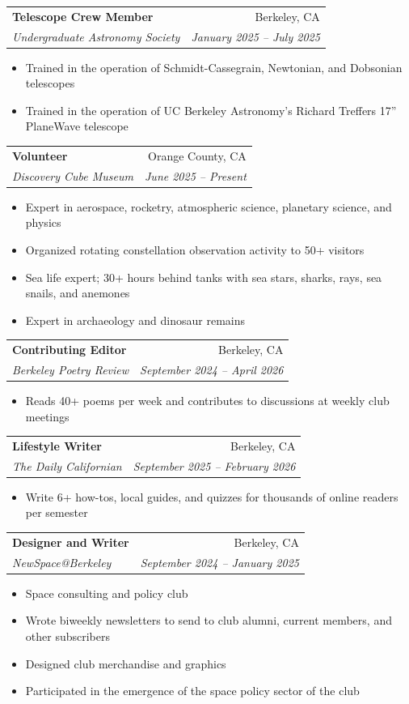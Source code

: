 \documentclass[a4paper,12pt]{article}
\makeatletter
\newenvironment{experience}[4]
    {
    \begin{tabularx}{\linewidth}{@{}X r@{}}
    \textbf{#1} & #3 \\
    \textit{#2} & \textit{#4} \\[-1pt]
    \end{tabularx}
    \begin{minipage}[t]{\linewidth}
    \begin{itemize}[nosep,after=\strut,leftmargin=1em,itemsep=3pt,label=\textopenbullet]
    }
    {
    \end{itemize}
    \end{minipage}
    }
\makeatother
\begin{document}
\begin{experience}
{Telescope Crew Member}
{Undergraduate Astronomy Society}
{Berkeley, CA}
{January 2025 -- July 2025}

\item Trained in the operation of Schmidt-Cassegrain, Newtonian, and Dobsonian telescopes

\item Trained in the operation of UC Berkeley Astronomy's Richard Treffers 17'' PlaneWave telescope

\end{experience}

\begin{experience}
{Volunteer}
{Discovery Cube Museum}
{Orange County, CA}
{June 2025 -- Present}

\item Expert in aerospace, rocketry, atmospheric science, planetary science, and physics

\item Organized rotating constellation observation activity to 50+ visitors

\item Sea life expert; 30+ hours behind tanks with sea stars, sharks, rays, sea snails, and anemones

\item Expert in archaeology and dinosaur remains

\end{experience}


\begin{experience}
{Contributing Editor}
{Berkeley Poetry Review}
{Berkeley, CA}
{September 2024 -- April 2026}

\item Reads 40+ poems per week and contributes to discussions at weekly club meetings

\end{experience}


\begin{experience}
{Lifestyle Writer}
{The Daily Californian}
{Berkeley, CA}
{September 2025 -- February 2026}

\item Write 6+ how-tos, local guides, and quizzes for thousands of online readers per semester

\end{experience}


\begin{experience}
{Designer and Writer}
{NewSpace@Berkeley}
{Berkeley, CA}
{September 2024 -- January 2025}

\item Space consulting and policy club

\item Wrote biweekly newsletters to send to club alumni, current members, and other subscribers

\item Designed club merchandise and graphics

\item Participated in the emergence of the space policy sector of the club

\end{experience}
\end{document}
